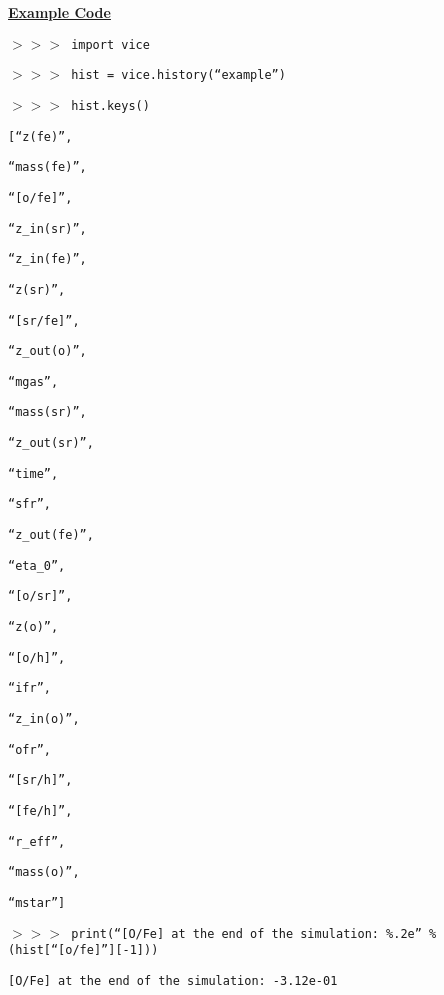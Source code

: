 \documentclass{report}
\begin{document}
\par\null\par\noindent 
\underline{\textbf{Example Code}} 
\par\noindent 
\texttt{$>>>$ import vice} \par\noindent 
\texttt{$>>>$ hist = vice.history(``example'')} \par\noindent 
\texttt{$>>>$ hist.keys()} \par\noindent 
\texttt{[``z(fe)'',} \par\noindent 
\texttt{``mass(fe)'',} \par\noindent 
\texttt{``[o/fe]'',} \par\noindent 
\texttt{``z\_in(sr)'',} \par\noindent 
\texttt{``z\_in(fe)'',} \par\noindent 
\texttt{``z(sr)'',} \par\noindent 
\texttt{``[sr/fe]'',} \par\noindent 
\texttt{``z\_out(o)'',} \par\noindent 
\texttt{``mgas'',} \par\noindent 
\texttt{``mass(sr)'',} \par\noindent 
\texttt{``z\_out(sr)'',} \par\noindent 
\texttt{``time'',} \par\noindent 
\texttt{``sfr'',} \par\noindent 
\texttt{``z\_out(fe)'',} \par\noindent 
\texttt{``eta\_0'',} \par\noindent 
\texttt{``[o/sr]'',} \par\noindent 
\texttt{``z(o)'',} \par\noindent 
\texttt{``[o/h]'',} \par\noindent 
\texttt{``ifr'',} \par\noindent 
\texttt{``z\_in(o)'',} \par\noindent 
\texttt{``ofr'',} \par\noindent 
\texttt{``[sr/h]'',} \par\noindent 
\texttt{``[fe/h]'',} \par\noindent 
\texttt{``r\_eff'',} \par\noindent 
\texttt{``mass(o)'',} \par\noindent 
\texttt{``mstar'']} \par\noindent 
\texttt{$>>>$ print(``[O/Fe] at the end of the simulation: \%.2e'' \% 
(hist[``[o/fe]''][-1]))} \par\noindent 
\texttt{[O/Fe] at the end of the simulation: -3.12e-01} \par\noindent 
\end{document}
